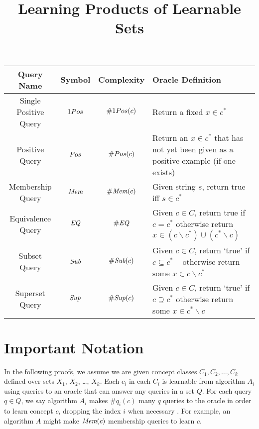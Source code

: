 \documentclass[11pt]{amsart}
\title{Learning Products of Learnable Sets}
\author{}
\begin{document}
\maketitle

\begin{table}
\begin{center}
  \begin{tabularx}{\textwidth}{| c | c | c | X | }
    \hline
    Query Name & Symbol & Complexity & Oracle Definition \\ \hline
    Single Positive Query & $\oneposQ$ & $\oneposC(c)$ & Return a fixed $x \in c^*$ \\ \hline
    Positive Query & $Pos$ & $\#Pos(c)$ & Return an $x\in c^*$ that has not yet been given as a positive example (if one exists)\\ \hline
    Membership Query & $\emph{Mem}$ & $\#\emph{Mem}(c)$ & Given string $s$, return true iff $s \in c^*$ \\ \hline
    Equivalence Query & $\emph{EQ}$ & $\#\emph{EQ}$ & Given $c \in C$, return true if $c=c^*$ otherwise return $x \in (c \backslash c^*) \cup (c^* \backslash c)$\\ \hline 
    Subset Query & $\emph{Sub}$ & $\#\emph{Sub}(c)$ & Given $c \in C$, return `true' if $c \subseteq c^*$ \mbox{  } otherwise return some $x \in c \backslash c^*$ \\ \hline
    Superset Query & $\emph{Sup}$ & $\#\emph{Sup}(c)$ & Given $c \in C$, return `true' if $c \supseteq c^*$  otherwise return some $x \in c^* \backslash c$\\ \hline
  \end{tabularx}
\end{center}
\end{table}

\section{Important Notation}

In the following proofs, we assume we are given concept classes $C_1, C_2, \dots, C_k$ defined over sets $X_1$, $X_2$, \dots, $X_k$. 
Each $c_i$ in each $C_i$ is learnable from algorithm $A_i$ using queries to an oracle that can answer any queries in a set $Q$. 
For each query $q \in Q$, we say algorithm $A_i$ makes $\#q_i(c)$ many $q$ queries to the oracle in order to learn concept $c$, dropping the index $i$ when necessary .
For example, an algorithm $A$ might make $\emph{Mem}(c)$ membership queries to learn $c$. 
\end{document}

